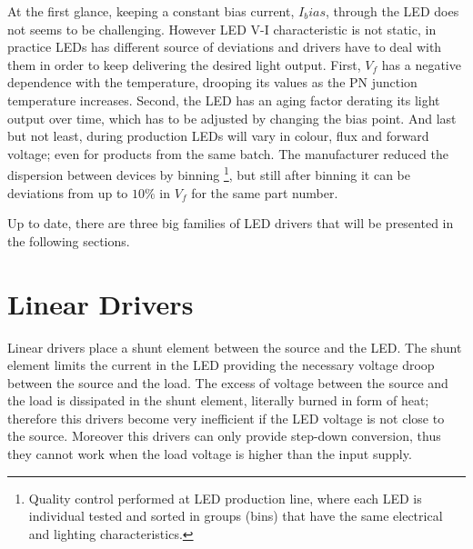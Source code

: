 \begin{figure}[!h]
\centering
{}
\caption {}
\label{fig:led_I-V}
\end{figure}

At the first glance, keeping a constant bias current, $I_bias$, through the LED does not seems to be challenging. However LED V-I characteristic is not static, in practice LEDs has different source of deviations and drivers have to deal with them in order to keep delivering the desired light output. First, $V_f$ has a negative dependence with the temperature, drooping its values as the PN junction temperature increases. Second, the LED has an aging factor derating its light output over time, which has to be adjusted by changing the bias point. And last but not least, during production LEDs will vary in colour, flux and forward voltage; even for products from the same batch. The manufacturer reduced the dispersion between devices by binning \footnote{Quality control performed at LED production line, where each LED is individual tested and sorted in groups (bins) that have the same electrical and lighting characteristics.}, but still after binning it can be deviations from up to $10\%$ in $V_f$ for the same part number.

Up to date, there are three big families of LED drivers that will be presented in the following sections.

\section{Linear Drivers}

 Linear drivers place a shunt element between the source and the LED. The shunt element limits the current in the LED providing the necessary voltage droop between the source and the load. The excess of voltage between the source and the load is dissipated in the shunt element, literally burned in form of heat; therefore this drivers become very inefficient if the LED voltage is not close to the source. Moreover this drivers can only provide step-down conversion, thus they cannot work when the load voltage is higher than the input supply.

